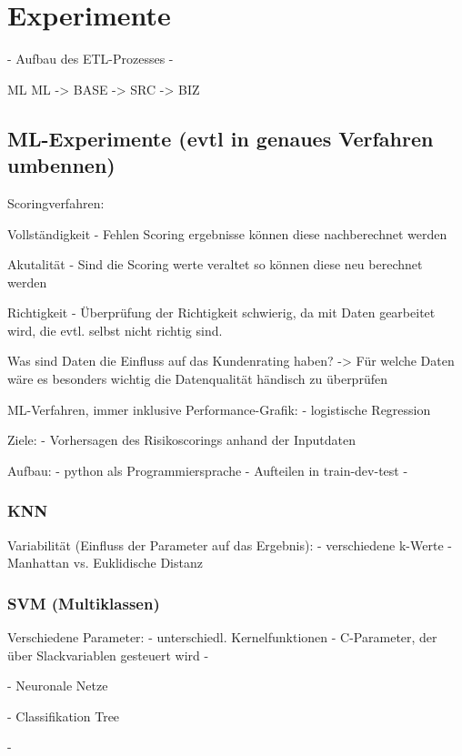 \chapter{Experimente}\label{ch:experiments}


- Aufbau des ETL-Prozesses - 

            ML     ML
-> BASE -> SRC -> BIZ

\section{ML-Experimente (evtl in genaues Verfahren umbennen)}
Scoringverfahren:

Vollständigkeit
- Fehlen Scoring ergebnisse können diese nachberechnet werden

Akutalität
- Sind die Scoring werte veraltet so können diese neu berechnet werden


Richtigkeit
- Überprüfung der Richtigkeit schwierig, da mit Daten gearbeitet wird, die evtl. selbst nicht richtig sind. 

Was sind Daten die Einfluss auf das Kundenrating haben?
-> Für welche Daten wäre es besonders wichtig die Datenqualität händisch zu überprüfen


ML-Verfahren, immer inklusive Performance-Grafik:
- logistische Regression


Ziele:
- Vorhersagen des Risikoscorings anhand der Inputdaten

Aufbau:
- python als Programmiersprache
- Aufteilen in train-dev-test
- 


\subsection{KNN}

Variabilität (Einfluss der Parameter auf das Ergebnis):
- verschiedene k-Werte 
- Manhattan vs. Euklidische Distanz


\subsection{SVM (Multiklassen)}

Verschiedene Parameter:
- unterschiedl. Kernelfunktionen
- C-Parameter, der über Slackvariablen gesteuert wird
- 

- Neuronale Netze

- Classifikation Tree




-

